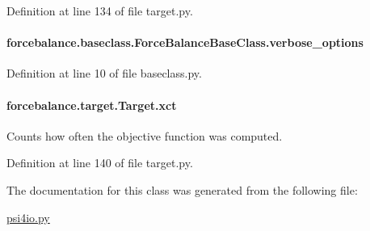 Definition at line 134 of file target.\-py.

\hypertarget{classforcebalance_1_1baseclass_1_1ForceBalanceBaseClass_a8088e1e20cbd6bc175fb9c9fe9fa0f18}{
\paragraph[{verbose\-\_\-options}]{\setlength{\rightskip}{0pt plus 5cm}forcebalance.\-baseclass.\-Force\-Balance\-Base\-Class.\-verbose\-\_\-options\hspace{0.3cm}{\ttfamily [inherited]}}}\label{classforcebalance_1_1baseclass_1_1ForceBalanceBaseClass_a8088e1e20cbd6bc175fb9c9fe9fa0f18}


Definition at line 10 of file baseclass.\-py.

\hypertarget{classforcebalance_1_1target_1_1Target_aad2e385cfbf7b4a68f1c2cb41133fe82}{
\paragraph[{xct}]{\setlength{\rightskip}{0pt plus 5cm}forcebalance.\-target.\-Target.\-xct\hspace{0.3cm}{\ttfamily [inherited]}}}\label{classforcebalance_1_1target_1_1Target_aad2e385cfbf7b4a68f1c2cb41133fe82}


Counts how often the objective function was computed. 



Definition at line 140 of file target.\-py.



The documentation for this class was generated from the following file\-:\begin{DoxyCompactItemize}
\item 
\hyperlink{psi4io_8py}{psi4io.\-py}\end{DoxyCompactItemize}
